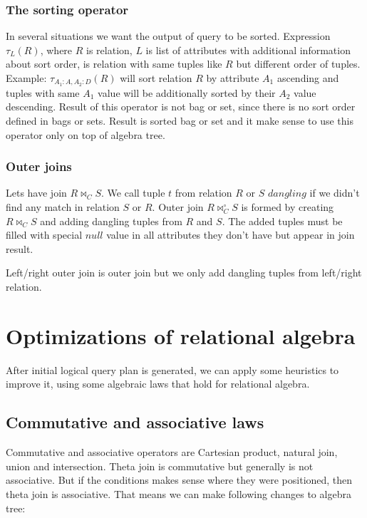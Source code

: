 \subsubsection{The sorting operator}

In several situations we want the output of query to be sorted. Expression $\tau_L(R)$, where $R$ is relation, $L$ is list of attributes with additional information about sort order, is relation with same tuples like $R$ but different order of tuples. Example:  $\tau_{A_1:A,A_2:D}(R)$ will sort relation $R$ by attribute $A_1$ ascending and tuples with same $A_1$ value will be additionally sorted by their $A_2$ value descending. Result of this operator is not bag or set, since there is no sort order defined in bags or sets. Result is sorted bag or set and it make sense to use this operator only on top of algebra tree.

\subsubsection{Outer joins}
Lets have join $R\Join_C S$. We call tuple $t$ from relation $R$ or $S$ $dangling$ if
we didn't find any match in relation $S$ or $R$. Outer join $R\Join^\circ_C S$ is formed by creating $R\Join_C S$ and adding dangling tuples from $R$ and $S$. The added tuples must be filled with special $null$ value in all attributes they don't have but appear in join result.

Left/right outer join is outer join but we only add dangling tuples from left/right relation.

\section{Optimizations of relational algebra}

After initial logical query plan is generated, we can apply some heuristics to improve it, using some algebraic laws that hold for relational algebra. 


\subsection{Commutative and associative laws}
Commutative and associative operators are Cartesian product, natural join, union and intersection. Theta join is commutative but generally is not associative. But if the conditions makes sense where they were positioned, then theta join is associative.
That means we can make following changes to algebra tree:

